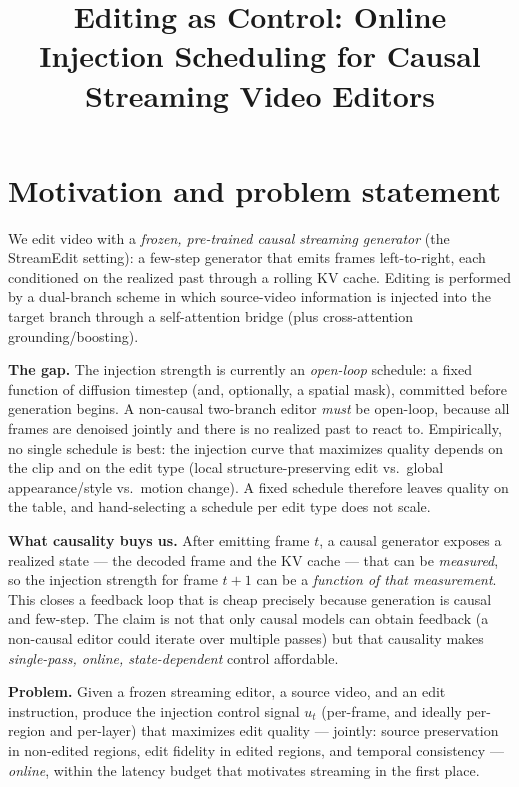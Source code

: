 \documentclass{article}
\title{Editing as Control: Online Injection Scheduling for Causal Streaming Video Editors}
\author{}
\date{}
\begin{document}
\maketitle

\section{Motivation and problem statement}

We edit video with a \emph{frozen, pre-trained causal streaming generator} (the StreamEdit
setting): a few-step generator that emits frames left-to-right, each conditioned on the
realized past through a rolling KV cache. Editing is performed by a dual-branch scheme in
which source-video information is injected into the target branch through a self-attention
bridge (plus cross-attention grounding/boosting).

\textbf{The gap.} The injection strength is currently an \emph{open-loop} schedule: a fixed
function of diffusion timestep (and, optionally, a spatial mask), committed before generation
begins. A non-causal two-branch editor \emph{must} be open-loop, because all frames are
denoised jointly and there is no realized past to react to. Empirically, no single schedule is
best: the injection curve that maximizes quality depends on the clip and on the edit type
(local structure-preserving edit vs.\ global appearance/style vs.\ motion change). A fixed
schedule therefore leaves quality on the table, and hand-selecting a schedule per edit type
does not scale.

\textbf{What causality buys us.} After emitting frame $t$, a causal generator exposes a
realized state --- the decoded frame and the KV cache --- that can be \emph{measured}, so the
injection strength for frame $t{+}1$ can be a \emph{function of that measurement}. This closes
a feedback loop that is cheap precisely because generation is causal and few-step. The claim
is not that only causal models can obtain feedback (a non-causal editor could iterate over
multiple passes) but that causality makes \emph{single-pass, online, state-dependent} control
affordable.

\textbf{Problem.} Given a frozen streaming editor, a source video, and an edit instruction,
produce the injection control signal $u_t$ (per-frame, and ideally per-region and per-layer)
that maximizes edit quality --- jointly: source preservation in non-edited regions, edit
fidelity in edited regions, and temporal consistency --- \emph{online}, within the latency
budget that motivates streaming in the first place.
\end{document}
